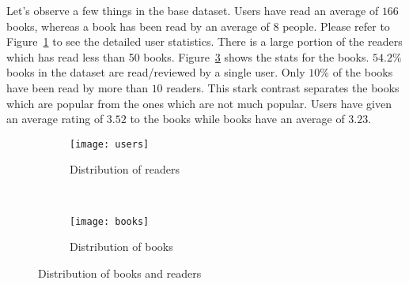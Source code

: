 \documentclass[11pt]{article}
\begin{document}
Let's observe a few things in the base dataset. Users have read an average of $166$ books, whereas a book has been read by an average of $8$ people. Please refer to Figure~\ref{fig:readers_book_read} to see the detailed user statistics. There is a large portion of the readers which has read less than 50 books. Figure~\ref{fig:books_books_read} shows the stats for the books. $54.2\%$ books in the dataset are read/reviewed by a single user. Only $10$\% of the books have been read by more than $10$ readers. This stark contrast separates the books which are popular from the ones which are not much popular. Users have given an average rating of $3.52$ to the books while books have an average of $3.23$.



\begin{figure}[ht]
        \centering
        \begin{subfigure}[b]{0.5\textwidth}
                \texttt{[image: users]}
                \caption{Distribution of readers}
                \label{fig:readers_book_read}
        \end{subfigure}%
        ~ %
        \begin{subfigure}[b]{0.5\textwidth}
                \texttt{[image: books]}
                \caption{Distribution of books}
                \label{fig:books_books_read}
        \end{subfigure}
        \caption{Distribution of books and readers}
\end{figure}



\end{document}
